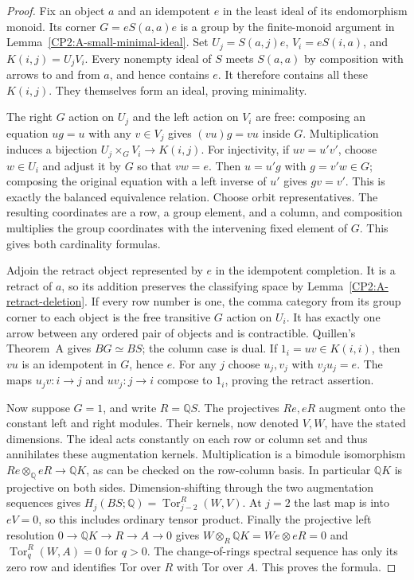 \begin{proof}
Fix an object $a$ and an idempotent $e$ in the least ideal
of its endomorphism monoid.  Its corner $G=eS(a,a)e$ is a
group by the finite-monoid argument in
Lemma~\ref{CP2:A-small-minimal-ideal}.  Set
$U_j=S(a,j)e$, $V_i=eS(i,a)$, and $K(i,j)=U_jV_i$.
Every nonempty ideal of $S$ meets $S(a,a)$ by composition
with arrows to and from $a$, and hence contains $e$.
It therefore contains all these $K(i,j)$.  They themselves
form an ideal, proving minimality.

The right $G$ action on $U_j$ and the left action on $V_i$
are free: composing an equation $ug=u$ with any
$v\in V_j$ gives $(vu)g=vu$ inside $G$.  Multiplication
induces a bijection $U_j\times_G V_i\to K(i,j)$.
For injectivity, if $uv=u'v'$, choose $w\in U_i$ and
adjust it by $G$ so that $vw=e$.  Then $u=u'g$ with
$g=v'w\in G$; composing the original equation with a
left inverse of $u'$ gives $gv=v'$.  This is exactly
the balanced equivalence relation.  Choose orbit
representatives.  The resulting coordinates are a row,
a group element, and a column, and composition multiplies
the group coordinates with the intervening fixed element
of $G$.  This gives both cardinality formulas.

Adjoin the retract object represented by $e$ in the
idempotent completion.  It is a retract of $a$, so its
addition preserves the classifying space by
Lemma~\ref{CP2:A-retract-deletion}.  If every row number
is one, the comma category from its group corner to each
object is the free transitive $G$ action on $U_i$.
It has exactly one arrow between any ordered pair of
objects and is contractible.  Quillen's Theorem~A gives
$BG\simeq BS$; the column case is dual.
If $1_i=uv\in K(i,i)$, then $vu$ is an idempotent in
$G$, hence $e$.  For any $j$ choose $u_j,v_j$ with
$v_ju_j=e$.  The maps $u_jv:i\to j$ and $uv_j:j\to i$
compose to $1_i$, proving the retract assertion.

Now suppose $G=1$, and write $R=\mathbb QS$.
The projectives $Re,eR$ augment onto the constant left
and right modules.  Their kernels, now denoted $V,W$,
have the stated dimensions.  The ideal acts constantly
on each row or column set and thus annihilates these
augmentation kernels.  Multiplication is a bimodule
isomorphism $Re\otimes_{\mathbb Q}eR\to\mathbb QK$,
as can be checked on the row-column basis.  In particular
$\mathbb QK$ is projective on both sides.
Dimension-shifting through the two augmentation sequences
gives $H_j(BS;\mathbb Q)=\operatorname{Tor}_{j-2}^R(W,V)$.
At $j=2$ the last map is into $eV=0$, so this includes
ordinary tensor product.  Finally the projective left
resolution $0\to\mathbb QK\to R\to A\to0$ gives
$W\otimes_R\mathbb QK=We\otimes eR=0$ and
$\operatorname{Tor}_{q}^R(W,A)=0$ for $q>0$.
The change-of-rings spectral sequence has only its
zero row and identifies Tor over $R$ with Tor over
$A$.  This proves the formula.
\end{proof}

